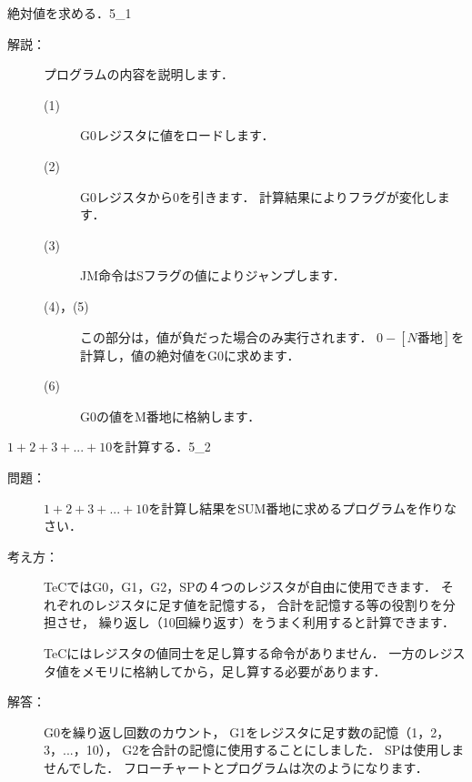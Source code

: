 \begin{reidai}{絶対値を求める．}{5_1}
\begin{description}
  \item[解説：]プログラムの内容を説明します．
    {\small
      \begin{description}
      \item[(1)] G0レジスタに値をロードします．
      \item[(2)] G0レジスタから0を引きます．
        計算結果によりフラグが変化します．
      \item[(3)] JM命令はSフラグの値によりジャンプします．
      \item[(4)，(5)] この部分は，値が負だった場合のみ実行されます．
        $0 - [N番地]$を計算し，値の絶対値をG0に求めます．
      \item[(6)] G0の値をM番地に格納します．
      \end{description}
    }

  \end{description}
\end{reidai}

\newpage
\begin{reidai}{$1 + 2 + 3 + ... + 10$を計算する．}{5_2}
  \begin{description}
  \item[問題：]
    $1 + 2 + 3 + ... + 10$を計算し結果をSUM番地に求めるプログラムを作りなさい．

  \item[考え方：]
    TeCではG0，G1，G2，SPの４つのレジスタが自由に使用できます．
    それぞれのレジスタに足す値を記憶する，
    合計を記憶する等の役割りを分担させ，
    繰り返し（10回繰り返す）をうまく利用すると計算できます．

    TeCにはレジスタの値同士を足し算する命令がありません．
    一方のレジスタ値をメモリに格納してから，足し算する必要があります．

  \item[解答：]
    G0を繰り返し回数のカウント，
    G1をレジスタに足す数の記憶（1，2，3，...，10），
    G2を合計の記憶に使用することにしました．
    SPは使用しませんでした．
    フローチャートとプログラムは次のようになります．

    \begin{center}
    \end{center}
  \end{description}
\end{reidai}

\vfill
